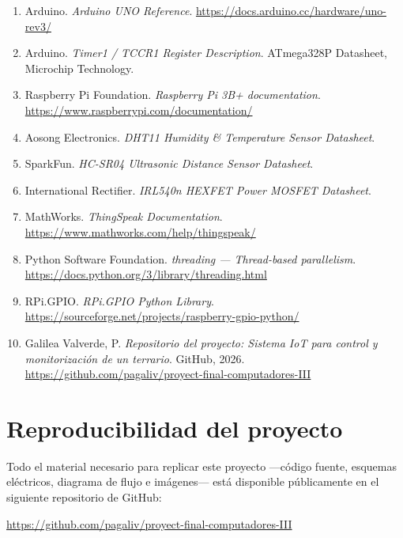 \documentclass[12pt, a4paper]{article}
\begin{document}
\begin{enumerate}
    \item Arduino. \textit{Arduino UNO Reference}.
          \url{https://docs.arduino.cc/hardware/uno-rev3/}
    \item Arduino. \textit{Timer1 / TCCR1 Register Description}. ATmega328P Datasheet,
          Microchip Technology.
    \item Raspberry Pi Foundation. \textit{Raspberry Pi 3B+ documentation}.
          \url{https://www.raspberrypi.com/documentation/}
    \item Aosong Electronics. \textit{DHT11 Humidity \& Temperature Sensor Datasheet}.
    \item SparkFun. \textit{HC-SR04 Ultrasonic Distance Sensor Datasheet}.
    \item International Rectifier. \textit{IRL540n HEXFET Power MOSFET Datasheet}.
    \item MathWorks. \textit{ThingSpeak Documentation}.
          \url{https://www.mathworks.com/help/thingspeak/}
    \item Python Software Foundation. \textit{threading — Thread-based parallelism}.
          \url{https://docs.python.org/3/library/threading.html}
    \item RPi.GPIO. \textit{RPi.GPIO Python Library}.
          \url{https://sourceforge.net/projects/raspberry-gpio-python/}
    \item Galilea Valverde, P. \textit{Repositorio del proyecto: Sistema IoT para
          control y monitorización de un terrario}. GitHub, 2026.
          \url{https://github.com/pagaliv/proyect-final-computadores-III}
\end{enumerate}

\newpage

\section*{Reproducibilidad del proyecto}

Todo el material necesario para replicar este proyecto ---código fuente, esquemas
eléctricos, diagrama de flujo e imágenes--- está disponible públicamente en el
siguiente repositorio de GitHub:

\begin{center}
    \url{https://github.com/pagaliv/proyect-final-computadores-III}
\end{center}
\end{document}
